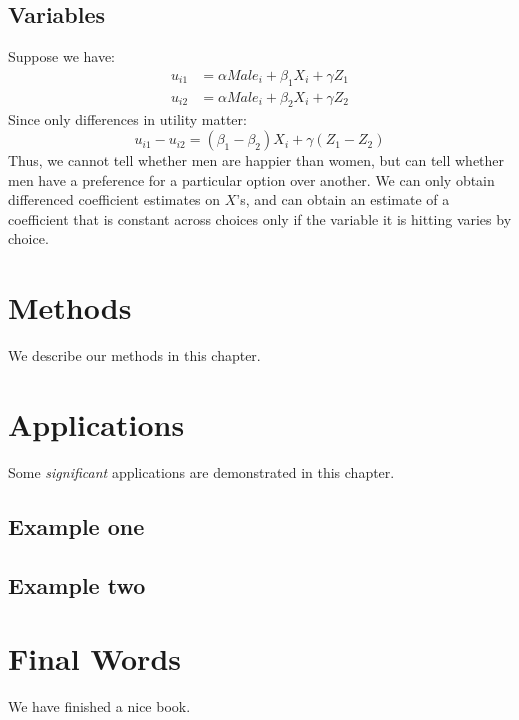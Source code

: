 \documentclass[]{book}
\begin{document}
\subsection{Variables}\label{variables}

Suppose we have: \[\begin{aligned}
u_{i1}&=\alpha Male_i+\beta_1 X_i + \gamma Z_1\\
u_{i2}&=\alpha Male_i+\beta_2 X_i+\gamma Z_2\end{aligned}\] Since only
differences in utility matter:
\[u_{i1}-u_{i2}=(\beta_1-\beta_2)X_i+\gamma (Z_1-Z_2)\] Thus, we cannot
tell whether men are happier than women, but can tell whether men have a
preference for a particular option over another. We can only obtain
differenced coefficient estimates on $X$'s, and can obtain an estimate
of a coefficient that is constant across choices only if the variable it
is hitting varies by choice.

\section{Methods}\label{methods}

We describe our methods in this chapter.

\section{Applications}\label{applications}

Some \emph{significant} applications are demonstrated in this chapter.

\subsection{Example one}\label{example-one}

\subsection{Example two}\label{example-two}

\section{Final Words}\label{final-words}

We have finished a nice book.
\end{document}
